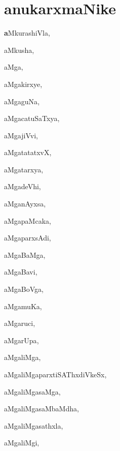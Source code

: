 \chapter*{anukarxmaNike}


\begin{multicols}{3}
{\small

\noindent
{{\large\textbf{a}}MkurashiVla}, \pageref{aMkurashiVla}

\noindent
{aMkusha}, \pageref{aMkusha}

\noindent
{aMga}, \pageref{aMga}

\noindent
{aMgakirxye}, \pageref{aMgakirxye}

\noindent
{aMgaguNa}, \pageref{aMgaguNa}

\noindent
{aMgacatuSaTxya}, \pageref{aMgacatuSaTxya}

\noindent
{aMgajiVvi}, \pageref{aMgajiVvi}

\noindent
{aMgatatatxvX}, \pageref{aMgatatatxvX}

\noindent
{aMgatarxya}, \pageref{aMgatarxya}

\noindent
{aMgadeVhi}, \pageref{aMgadeVhi}

\noindent
{aMganAyxsa}, \pageref{aMganAyxsa}

\noindent
{aMgapaMcaka}, \pageref{aMgapaMcaka}

\noindent
{aMgaparxsAdi}, \pageref{aMgaparxsAdi}

\noindent
{aMgaBaMga}, \pageref{aMgaBaMga}

\noindent
{aMgaBavi}, \pageref{aMgaBavi}

\noindent
{aMgaBoVga}, \pageref{aMgaBoVga}

\noindent
{aMgamuKa}, \pageref{aMgamuKa}

\noindent
{aMgaruci}, \pageref{aMgaruci}

\noindent
{aMgarUpa}, \pageref{aMgarUpa}

\noindent
{aMgaliMga}, \pageref{aMgaliMga}

\noindent
{aMgaliMgaparxtiSAThxdiVkeSx}, \pageref{aMgaliMgaparxtiSAThxdiVkeSx}

\noindent
{aMgaliMgasaMga}, \pageref{aMgaliMgasaMga}

\noindent
{aMgaliMgasaMbaMdha}, \pageref{aMgaliMgasaMbaMdha}

\noindent
{aMgaliMgasathxla}, \pageref{aMgaliMgasathxla}

\noindent
{aMgaliMgi}, \pageref{aMgaliMgi}

}
\end{multicols}
